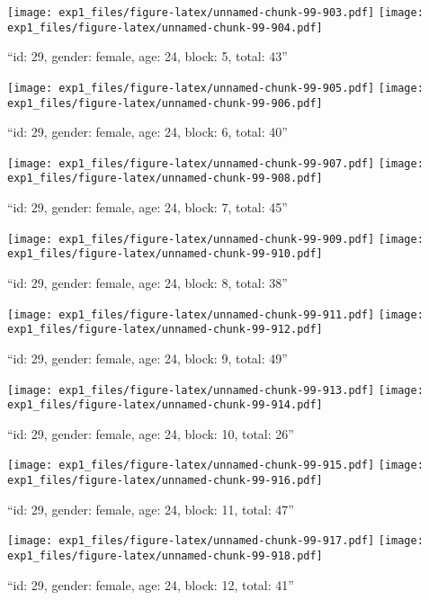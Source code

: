 \documentclass[,]{article}
\begin{document}
\texttt{[image: exp1\_files/figure-latex/unnamed-chunk-99-903.pdf]}
\texttt{[image: exp1\_files/figure-latex/unnamed-chunk-99-904.pdf]}

\newpage
[1] 

``id: 29, gender: female, age: 24, block: 5, total: 43''

\texttt{[image: exp1\_files/figure-latex/unnamed-chunk-99-905.pdf]}
\texttt{[image: exp1\_files/figure-latex/unnamed-chunk-99-906.pdf]}

\newpage
[1] 

``id: 29, gender: female, age: 24, block: 6, total: 40''

\texttt{[image: exp1\_files/figure-latex/unnamed-chunk-99-907.pdf]}
\texttt{[image: exp1\_files/figure-latex/unnamed-chunk-99-908.pdf]}

\newpage
[1] 

``id: 29, gender: female, age: 24, block: 7, total: 45''

\texttt{[image: exp1\_files/figure-latex/unnamed-chunk-99-909.pdf]}
\texttt{[image: exp1\_files/figure-latex/unnamed-chunk-99-910.pdf]}

\newpage
[1] 

``id: 29, gender: female, age: 24, block: 8, total: 38''

\texttt{[image: exp1\_files/figure-latex/unnamed-chunk-99-911.pdf]}
\texttt{[image: exp1\_files/figure-latex/unnamed-chunk-99-912.pdf]}

\newpage
[1] 

``id: 29, gender: female, age: 24, block: 9, total: 49''

\texttt{[image: exp1\_files/figure-latex/unnamed-chunk-99-913.pdf]}
\texttt{[image: exp1\_files/figure-latex/unnamed-chunk-99-914.pdf]}

\newpage
[1] 

``id: 29, gender: female, age: 24, block: 10, total: 26''

\texttt{[image: exp1\_files/figure-latex/unnamed-chunk-99-915.pdf]}
\texttt{[image: exp1\_files/figure-latex/unnamed-chunk-99-916.pdf]}

\newpage
[1] 

``id: 29, gender: female, age: 24, block: 11, total: 47''

\texttt{[image: exp1\_files/figure-latex/unnamed-chunk-99-917.pdf]}
\texttt{[image: exp1\_files/figure-latex/unnamed-chunk-99-918.pdf]}

\newpage
[1] 

``id: 29, gender: female, age: 24, block: 12, total: 41''
\end{document}
